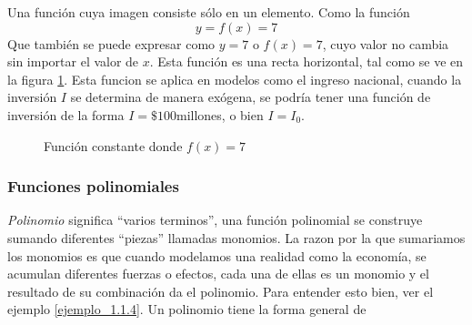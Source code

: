 Una función cuya imagen consiste sólo en un elemento. Como la función 
\[
y=f(x)=7
\]
Que también se puede expresar como \(y=7\) o \(f(x)=7\), cuyo valor no cambia sin importar el valor de \(x\). Esta función es una recta horizontal, tal como se ve en la figura \ref{Type_funcion_constante}. Esta funcion se aplica en modelos como el ingreso nacional, cuando la inversión \(I\) se determina de manera exógena, se podría tener una función de inversión de la forma \(I=\mathdollar{100}\)millones, o bien \(I=I_0\).

\begin{figure}[!ht]
    \centering
    \caption{Función constante donde \(f(x)=7\)}
    \label{Type_funcion_constante}
\end{figure}



\subsubsection{Funciones polinomiales}

\textit{Polinomio} significa ``varios terminos'', una función polinomial se construye sumando diferentes ``piezas'' llamadas monomios. La razon por la que sumariamos los monomios es que cuando modelamos una realidad como la economía, se acumulan diferentes fuerzas o efectos, cada una de ellas es un monomio y el resultado de su combinación da el polinomio. Para entender esto bien, ver el ejemplo \ref{ejemplo_1.1.4}. Un polinomio tiene la forma general de 


